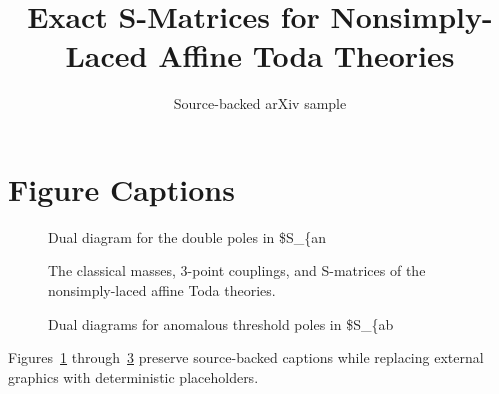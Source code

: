 \documentclass[11pt]{article}
\title{Exact S-Matrices for Nonsimply-Laced Affine Toda Theories}
\author{Source-backed arXiv sample}
\date{}
\begin{document}
\maketitle
\section{Figure Captions}

\begin{figure}[htbp]
\centering
\fbox{\rule{0pt}{1.15in}\rule{0.78\linewidth}{0pt}}
\caption{Dual diagram for the double poles in \$S\_\{an}
\label{fig:source-1}
\end{figure}


\begin{figure}[htbp]
\centering
\fbox{\rule{0pt}{1.15in}\rule{0.78\linewidth}{0pt}}
\caption{The classical masses, 3-point couplings, and S-matrices of the nonsimply-laced affine Toda theories.}
\label{fig:source-2}
\end{figure}


\begin{figure}[htbp]
\centering
\fbox{\rule{0pt}{1.15in}\rule{0.78\linewidth}{0pt}}
\caption{Dual diagrams for anomalous threshold poles in \$S\_\{ab}
\label{fig:source-3}
\end{figure}


Figures~\ref{fig:source-1} through~\ref{fig:source-3} preserve source-backed captions while replacing external graphics with deterministic placeholders.
\end{document}
